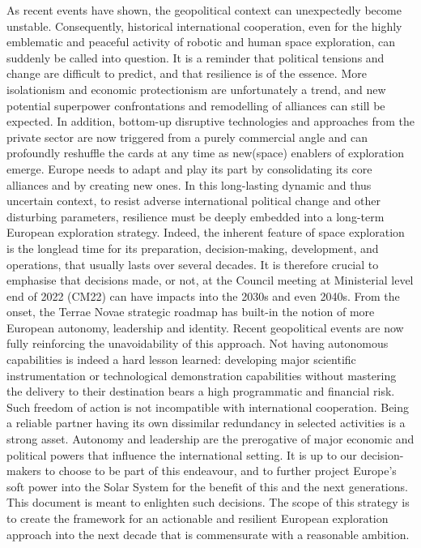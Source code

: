 \documentclass[12pt]{article}
\begin{document}
As recent events have shown, the geopolitical context can unexpectedly become unstable. Consequently, historical international cooperation, even for the highly emblematic and peaceful activity of robotic and human space exploration, can suddenly be called into question. It is a reminder that political tensions and change are difficult to predict, and that resilience is of the essence. More isolationism and economic protectionism are unfortunately a trend, and new potential superpower confrontations and remodelling of alliances can still be expected. In addition, bottom-up disruptive technologies and approaches from the private sector are now triggered from a purely commercial angle and can profoundly reshuffle the cards at any time as new(space) enablers of exploration emerge. Europe needs to adapt and play its part by consolidating its core alliances and by creating new ones. In this long-lasting dynamic and thus uncertain context, to resist adverse international political change and other disturbing parameters, resilience must be deeply embedded into a long-term European exploration strategy. Indeed, the inherent feature of space exploration is the longlead time for its preparation, decision-making, development, and operations, that usually lasts over several decades. It is therefore crucial to emphasise that decisions made, or not, at the Council meeting at Ministerial level end of 2022 (CM22) can have impacts into the 2030s and even 2040s. From the onset, the Terrae Novae strategic roadmap has built-in the notion of more European autonomy, leadership and identity. Recent geopolitical events are now fully reinforcing the unavoidability of this approach. Not having autonomous capabilities is indeed a hard lesson learned: developing major scientific instrumentation or technological demonstration capabilities without mastering the delivery to their destination bears a high programmatic and financial risk. Such freedom of action is not incompatible with international cooperation. Being a reliable partner having its own dissimilar redundancy in selected activities is a strong asset. Autonomy and leadership are the prerogative of major economic and political powers that influence the international setting. It is up to our decision-makers to choose to be part of this endeavour, and to further project Europe’s soft power into the Solar System for the benefit of this and the next generations. This document is meant to enlighten such decisions. The scope of this strategy is to create the framework for an actionable and resilient European exploration approach into the next decade that is commensurate with a reasonable ambition.
\end{document}
